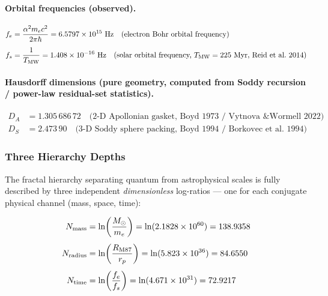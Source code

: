\documentclass[11pt,a4paper]{article}
\begin{document}
        \paragraph{Orbital frequencies (observed).}
        \begin{align*}
          f_e &= \frac{\alpha^2 m_e c^2}{2\pi\hbar}
               = 6.5797 \times 10^{15}\ \mathrm{Hz}
               \quad\text{(electron Bohr orbital frequency)} \\[4pt]
          f_s &= \frac{1}{T_{\rm MW}}
               = 1.408 \times 10^{-16}\ \mathrm{Hz}
               \quad\text{(solar orbital frequency,}\ T_{\rm MW} = 225\ \mathrm{Myr,}
               \text{ Reid et al.\ 2014)}
        \end{align*}

        \paragraph{Hausdorff dimensions (pure geometry, computed from
        Soddy recursion / power-law residual-set statistics).}
        \begin{align*}
          D_A &= 1.305\,686\,72
               \quad\text{(2-D Apollonian gasket, Boyd 1973 /
               Vytnova \& Wormell 2022)} \\
          D_S &= 2.473\,90
               \quad\text{(3-D Soddy sphere packing, Boyd 1994 /
               Borkovec et al.\ 1994)}
        \end{align*}

      \subsubsection{Three Hierarchy Depths}

        The fractal hierarchy separating quantum from astrophysical scales
        is fully described by three independent \emph{dimensionless}
        log-ratios — one for each conjugate physical channel (mass,
        space, time):

        \begin{align}
          N_{\rm mass}   &= \ln\!\left(\frac{M_\odot}{m_e}\right)
                          = \ln(2.1828\times10^{60})
                          = 138.9358 \label{eq:Nmass}\\[4pt]
          N_{\rm radius} &= \ln\!\left(\frac{R_{\rm M87}}{r_p}\right)
                          = \ln(5.823\times10^{36})
                          = 84.6550 \label{eq:Nradius}\\[4pt]
          N_{\rm time}   &= \ln\!\left(\frac{f_e}{f_s}\right)
                          = \ln(4.671\times10^{31})
                          = 72.9217 \label{eq:Ntime}
        \end{align}
\end{document}
